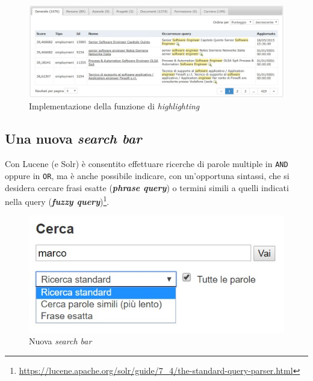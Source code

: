 \begin{figure}[H]
	\centering
	\includegraphics[scale=0.57]{../images/03_5_highlight}
	\caption[Implementazione della funzione di \textit{highlighting}]{Implementazione della funzione di \textit{highlighting}}
	\label{fig:gui4}
\end{figure}



\pagebreak
\subsection{Una nuova \textit{search bar}}

Con Lucene (e Solr) è consentito effettuare ricerche di parole multiple in \texttt{AND} oppure in \texttt{OR}, ma è anche possibile indicare, con un’opportuna sintassi, che si desidera cercare frasi esatte (\textit{\textbf{phrase query}}) o termini simili a quelli indicati nella query (\textit{\textbf{fuzzy query}})\footnote{\url{https://lucene.apache.org/solr/guide/7\_4/the-standard-query-parser.html}}.

\begin{figure}
	\includegraphics[scale=0.57]{../images/03_6_search_bar}
	\caption[Nuova \textit{search bar}]{Nuova \textit{search bar}}
  	\label{fig:gui5}
\end{figure}

\vspace{1em}

